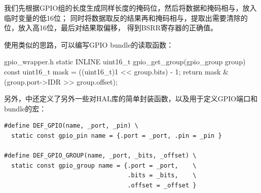 我们先根据GPIO组的长度生成同样长度的掩码位，然后将数据和掩码相与，放入临时变量的低16位；
同时将数据取反的结果再和掩码相与，提取出需要清除的位，放入高16位，最后对结果取偏移，
得到BSRR寄存器的正确值。

使用类似的思路，可以编写GPIO bundle的读取函数：

\begin{cbox}{gpio\_wrapper.h}
static INLINE uint16_t
gpio_get_group(gpio_group group)
{
  const uint16_t mask = ((uint16_t)1 << group.bits) - 1;
  return mask & (group.port->IDR >> group.offset);
}
\end{cbox}

另外，中还定义了另外一些对HAL库的简单封装函数，以及用于定义GPIO端口和
bundle的宏：

\begin{verbatim}
#define DEF_GPIO(name, _port, _pin) \
  static const gpio_pin name = {.port = _port, .pin = _pin }

#define DEF_GPIO_GROUP(name, _port, _bits, _offset) \
  static const gpio_group name = {.port = _port,    \
                                  .bits = _bits,    \
                                  .offset = _offset }
\end{verbatim}
